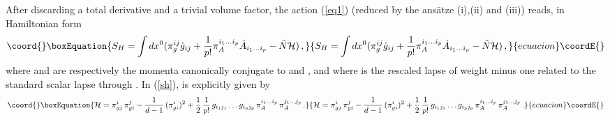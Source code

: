 \documentclass[a4paper,12pt]{article}
\begin{document}
After discarding a total derivative and a trivial volume factor, the 
action (\ref{eq1}) (reduced by the ans\"atze (i),(ii) and (iii))
reads, in Hamiltonian form
\begin{equation}\coord{}\boxEquation{
S_H = \int d x^0 (\pi_g^{ij} \dot{g}_{ij}
+ \frac{1}{p!} \pi_A^{i_1 \ldots i_p} \dot{A}_{i_1 \ldots i_p}
- \tilde{N} {\cal H}) \, ,
\label{sh}
}{
S_H = \int d x^0 (\pi_g^{ij} \dot{g}_{ij}
+ \frac{1}{p!} \pi_A^{i_1 \ldots i_p} \dot{A}_{i_1 \ldots i_p}
- \tilde{N} {\cal H}) \, ,
}{ecuacion}\coordE{}\end{equation}
where \coordHE{} and \coordHE{} are respectively the momenta canonically
conjugate to \coordHE{} and \coordHE{}, and where \coordHE{} is the rescaled lapse of weight
minus one related to the standard scalar lapse through \coordHE{}.
In (\ref{sh}), \coordHE{} is explicitly given by
\coordHE{}
\begin{equation}\coord{}\boxEquation{
{\cal H} =  \pi_{gj}^i \,
\pi_{gi}^j - \frac{1}{d-1} \, (\pi_{gi}^i)^2 + \frac{1}{2} \,
\frac{1}{p!} \, g_{i_1 j_1} \ldots g_{i_p j_p} \, \pi_A^{i_1 \ldots
i_p} \, \pi_A^{j_1 \ldots j_p} \, . \label{eq14}
}{
{\cal H} =  \pi_{gj}^i \,
\pi_{gi}^j - \frac{1}{d-1} \, (\pi_{gi}^i)^2 + \frac{1}{2} \,
\frac{1}{p!} \, g_{i_1 j_1} \ldots g_{i_p j_p} \, \pi_A^{i_1 \ldots
i_p} \, \pi_A^{j_1 \ldots j_p} \, . }{ecuacion}\coordE{}\end{equation}   
\end{document}
